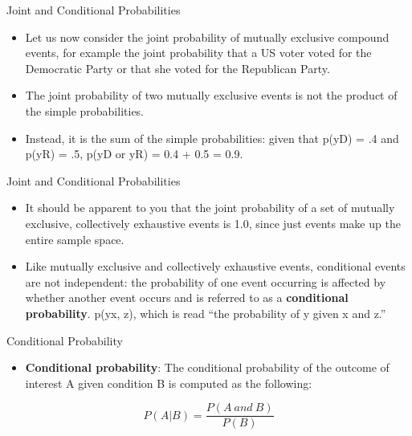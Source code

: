 \documentclass[
  ignorenonframetext,
]{beamer}
\providecommand{\tightlist}{%
  \setlength{\itemsep}{0pt}\setlength{\parskip}{0pt}}
\begin{document}
\begin{frame}{Joint and Conditional Probabilities}
\protect\hypertarget{joint-and-conditional-probabilities-2}{}

\begin{itemize}
\item
  Let us now consider the joint probability of mutually exclusive
  compound events, for example the joint probability that a US voter
  voted for the Democratic Party or that she voted for the Republican
  Party.
\item
  The joint probability of two mutually exclusive events is not the
  product of the simple probabilities.
\item
  Instead, it is the sum of the simple probabilities: given that p(yD) =
  .4 and p(yR) = .5, p(yD or yR) = 0.4 + 0.5 = 0.9.
\end{itemize}

\end{frame}

\begin{frame}{Joint and Conditional Probabilities}
\protect\hypertarget{joint-and-conditional-probabilities-3}{}

\begin{itemize}
\item
  It should be apparent to you that the joint probability of a set of
  mutually exclusive, collectively exhaustive events is 1.0, since just
  events make up the entire sample space.
\item
  Like mutually exclusive and collectively exhaustive events,
  conditional events are not independent: the probability of one event
  occurring is affected by whether another event occurs and is referred
  to as a \textbf{conditional probability}. p(y\textbar x, z), which is
  read ``the probability of y given x and z.''
\end{itemize}

\end{frame}

\begin{frame}{Conditional Probability}
\protect\hypertarget{conditional-probability}{}

\begin{itemize}
\tightlist
\item
  \textbf{Conditional probability}: The conditional probability of the
  outcome of interest A given condition B is computed as the following:
\end{itemize}

\[P(A|B) = \frac{P(A \ and \ B)}{P(B)}\]

\end{frame}
\end{document}
